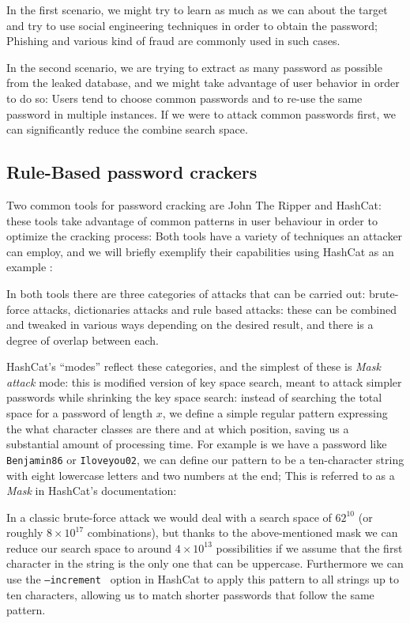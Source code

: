 In the first scenario, we might try to learn as much as we can about the target and try to use social engineering techniques in order to obtain the password; Phishing and various kind of fraud are commonly used in such cases.

In the second scenario, we are trying to extract as many password as possible from the leaked database, and we might take advantage of user behavior in order to do so: Users tend to choose common passwords and to re-use the same password in multiple instances. If we were to attack common passwords first, we can significantly reduce the combine search space.

\subsection{Rule-Based password crackers}

Two common tools for password cracking are John The Ripper and \break \mbox{HashCat}\cite{john,hash_cat}: these tools take advantage of common patterns in user behaviour in order to optimize the cracking process: Both tools have a variety of techniques an attacker can employ, and we will briefly exemplify their capabilities using HashCat as an example \cite{hash_cat_wiki}: \newline

In both tools there are three categories of attacks that can be carried out: brute-force attacks, dictionaries attacks and rule based attacks: these can be combined and tweaked in various ways depending on the desired result, and there is a degree of overlap between each.\newline 

HashCat's \enquote{modes} reflect these categories, and the simplest of these is \emph{Mask attack} mode: this is modified version of key space search, meant to attack simpler passwords while shrinking the key space search: 
instead of searching the total space for a password of length $x$, we define a simple regular pattern expressing the what character classes are there and at which position, saving us a substantial amount of processing time.
For example is we have a password like \texttt{Benjamin86} or \texttt{Iloveyou02}, we can define our pattern to be a ten-character string with eight lowercase letters and two numbers at the end; This is referred to as a \emph{Mask} in HashCat's documentation:

In a classic brute-force attack we would deal with a search space of $62^{10}$ (or roughly $8 \times 10^{17}$ combinations), but thanks to the above-mentioned mask we can reduce our search space to around $4 \times 10^{13}$ possibilities if we assume that the first character in the string is the only one that can be uppercase.
Furthermore we can use the \texttt{--increment } option in HashCat to apply this pattern to all strings up to ten characters, allowing us to match shorter passwords that follow the same pattern.

